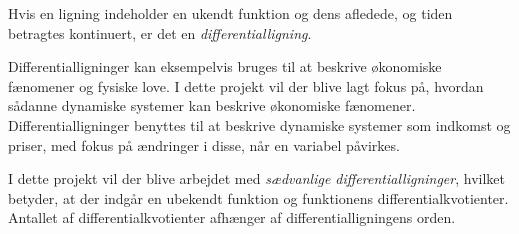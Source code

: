 Hvis en ligning indeholder en ukendt funktion og dens afledede, og tiden betragtes kontinuert, er det en \textit{differentialligning}.

Differentialligninger kan eksempelvis bruges til at beskrive økonomiske fænomener og fysiske love. I dette projekt vil der blive lagt fokus på, hvordan sådanne dynamiske systemer kan beskrive økonomiske fænomener. Differentialligninger benyttes til at beskrive dynamiske systemer som indkomst og priser, med fokus på ændringer i disse, når en variabel påvirkes. 

I dette projekt vil der blive arbejdet med \textit{sædvanlige differentialligninger}, hvilket betyder, at der indgår en ubekendt funktion og funktionens differentialkvotienter. Antallet af differentialkvotienter afhænger af differentialligningens orden.

